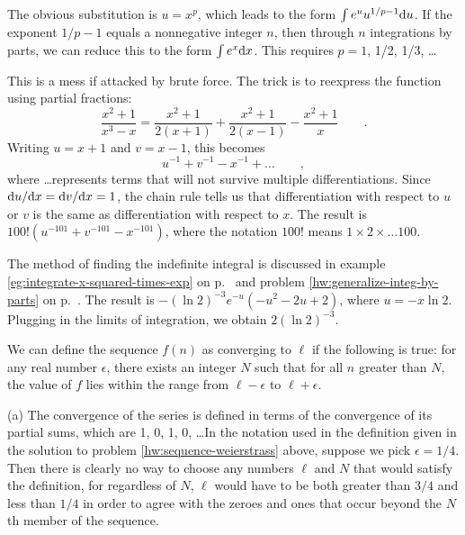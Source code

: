The obvious substitution is $u=x^p$, which leads to the form
$\int e^u u^{1/p-1}\textup{d} u$. If the exponent $1/p-1$ equals a nonnegative integer $n$, then
through $n$ integrations by parts, we can reduce this to the form $\int e^x\textup{d} x$.
This requires $p=1$, 1/2, 1/3, \ldots

This is a mess if attacked by brute force. The trick is to reexpress the function using partial fractions:
\begin{equation*}
  \frac{x^2+1}{x^3-x} = \frac{x^2+1}{2(x+1)}+\frac{x^2+1}{2(x-1)}-\frac{x^2+1}{x} \qquad .
\end{equation*}
Writing $u=x+1$ and $v=x-1$, this becomes
\begin{equation*}
  u^{-1}+v^{-1}-x^{-1}+\ldots \qquad ,
\end{equation*}
where \ldots represents terms that will not survive multiple differentiations. Since $\textup{d} u/\textup{d} x=\textup{d} v/\textup{d} x=1$,
the chain rule tells us that differentiation with respect to $u$ or $v$ is the same as differentiation with respect
to $x$. The result is $100!(u^{-101}+v^{-101}-x^{-101})$, where the notation $100!$ means $1\times2\times\ldots100$.



The method of finding the indefinite integral is discussed in example \ref{eg:integrate-x-squared-times-exp} on p.~\pageref{eg:integrate-x-squared-times-exp}
and problem \ref{hw:generalize-integ-by-parts} on p.~\pageref{hw:generalize-integ-by-parts}. The result is
$-(\ln 2)^{-3}e^{-u}\left(-u^2-2u+2\right)$, where $u=-x\ln 2$. Plugging in the limits of integration, we obtain $2(\ln 2)^{-3}$.



We can define the sequence $f(n)$ as converging to $\ell$
if the following is true: for any real number $\epsilon$, there exists an integer
$N$ such that for all $n$ greater than $N$,
the value of $f$ lies within the range from $\ell-\epsilon$ to $\ell+\epsilon$.


(a) The convergence of the series is defined in terms of the convergence of its partial sums,
which are 1, 0, 1, 0, \ldots In the notation used in the definition given in the solution to
problem \ref{hw:sequence-weierstrass} above, suppose we pick $\epsilon=1/4$. Then there is
clearly no way to choose any numbers $\ell$ and $N$ that would satisfy the definition,
for regardless of $N$, $\ell$ would have to be both greater than $3/4$ and less than $1/4$
in order to agree with the zeroes and ones that occur beyond the $N$th member of the sequence.

